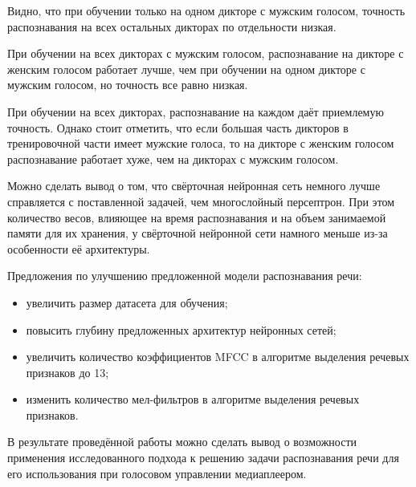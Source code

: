 Видно, что при обучении только на одном дикторе с мужским голосом, точность распознавания на всех остальных дикторах по отдельности низкая. 

При обучении на всех дикторах с мужским голосом, распознавание на дикторе с женским голосом работает лучше, чем при обучении на одном дикторе с мужским голосом, но точность все равно низкая.

При обучении на всех дикторах, распознавание на каждом даёт приемлемую точность. Однако стоит отметить, что если большая часть дикторов в тренировочной части имеет мужские голоса, то на дикторе с женским голосом распознавание работает хуже, чем на дикторах с мужским голосом.

Можно сделать вывод о том, что свёрточная нейронная сеть немного лучше справляется с поставленной задачей, чем многослойный персептрон. При этом количество весов, влияющее на время распознавания и на объем занимаемой памяти для их хранения, у свёрточной нейронной сети намного меньше из-за особенности её архитектуры.

Предложения по улучшению предложенной модели распознавания речи:
\begin{itemize}[leftmargin=2cm]
	\item увеличить размер датасета для обучения;
	\item повысить глубину предложенных архитектур нейронных сетей;
	\item увеличить количество коэффициентов MFCC в алгоритме выделения речевых признаков до 13;
	\item изменить количество мел-фильтров в алгоритме выделения речевых признаков.
\end{itemize}

В результате проведённой работы можно сделать вывод о возможности применения исследованного подхода к решению задачи распознавания речи для его использования при голосовом управлении медиаплеером.